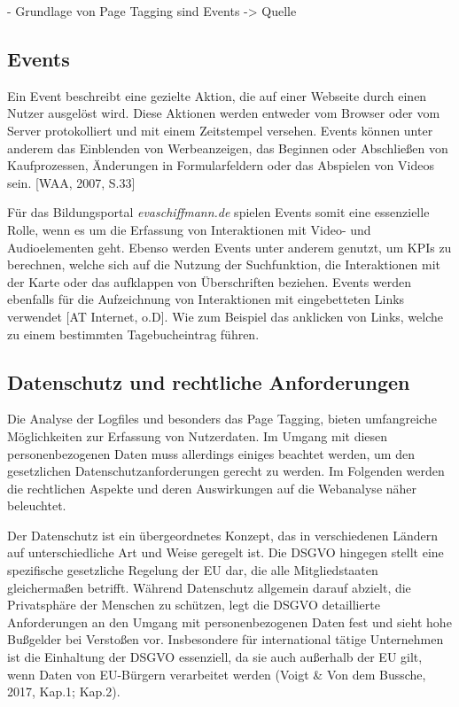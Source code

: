 - Grundlage von Page Tagging sind Events -> Quelle

\subsection{Events}
Ein Event beschreibt eine gezielte Aktion, die auf einer Webseite durch einen Nutzer ausgelöst wird. Diese Aktionen werden entweder vom Browser oder vom Server protokolliert und mit einem Zeitstempel versehen. Events können unter anderem das Einblenden von Werbeanzeigen, das Beginnen oder Abschließen von Kaufprozessen, Änderungen in Formularfeldern oder das Abspielen von Videos sein. [WAA, 2007, S.33]

Für das Bildungsportal \textit{evaschiffmann.de} spielen Events somit eine essenzielle Rolle, wenn es um die Erfassung von Interaktionen mit Video- und Audioelementen geht. Ebenso werden Events unter anderem genutzt, um KPIs zu berechnen, welche sich auf die Nutzung der Suchfunktion, die Interaktionen mit der Karte oder das aufklappen von Überschriften beziehen. Events werden ebenfalls für die Aufzeichnung von Interaktionen mit eingebetteten Links verwendet [AT Internet, o.D]. Wie zum Beispiel das anklicken von Links, welche zu einem bestimmten Tagebucheintrag führen.

\subsection{Datenschutz und rechtliche Anforderungen}
\label{sec:datenschutz}
Die Analyse der Logfiles und besonders das Page Tagging, bieten umfangreiche Möglichkeiten zur Erfassung von Nutzerdaten. Im Umgang mit diesen personenbezogenen Daten muss allerdings einiges beachtet werden, um den gesetzlichen Datenschutzanforderungen gerecht zu werden. Im Folgenden werden die rechtlichen Aspekte und deren Auswirkungen auf die Webanalyse näher beleuchtet.

Der Datenschutz ist ein übergeordnetes Konzept, das in verschiedenen Ländern auf unterschiedliche Art und Weise geregelt ist. Die DSGVO hingegen stellt eine spezifische gesetzliche Regelung der EU dar, die alle Mitgliedstaaten gleichermaßen betrifft. Während Datenschutz allgemein darauf abzielt, die Privatsphäre der Menschen zu schützen, legt die DSGVO detaillierte Anforderungen an den Umgang mit personenbezogenen Daten fest und sieht hohe Bußgelder bei Verstoßen vor. Insbesondere für international tätige Unternehmen ist die Einhaltung der DSGVO essenziell, da sie auch außerhalb der EU gilt, wenn Daten von EU-Bürgern verarbeitet werden (Voigt \& Von dem Bussche, 2017, Kap.1; Kap.2).

